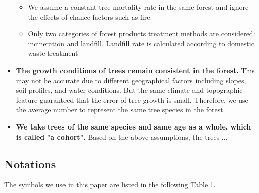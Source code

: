 \begin{itemize}
\begin{itemize}
  \item We assume a constant tree mortality rate in the same forest and ignore the effects of chance factors such as fire.
  \item Only two categories of forest products treatment methods are considered: incineration and landfill. Landfill rate is calculated according to domestic waste treatment
  \end{itemize}
\item \textbf {The growth conditions of trees remain consistent in the forest.   }This may not be accurate due to different geographical factors including slopes, soil profiles, and water conditions. But the same climate and topographic feature guaranteed that the error of tree growth is small. Therefore, we use the average number to represent the same tree species in the forest.
\item \textbf {We take trees of the same species and same age as a whole, which is called "a cohort".} Based on the above assumptions, the trees ...
\end{itemize}


\newpage %
\subsection{Notations}

The symbols we use in this paper are listed in the following Table 1.

